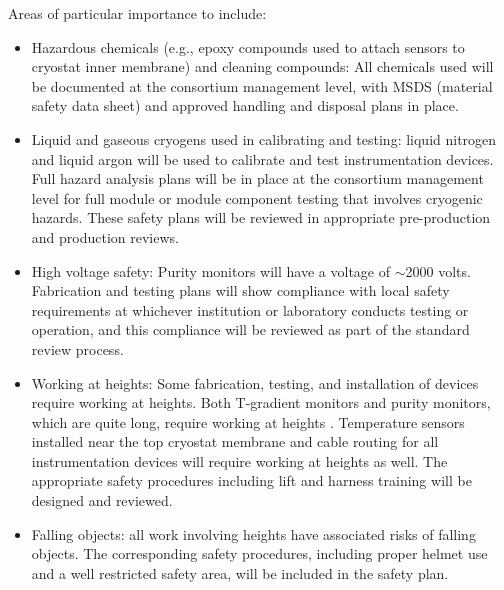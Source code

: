 Areas of particular importance to  include:
\begin{itemize}
\item Hazardous chemicals (e.g., epoxy compounds used to attach sensors to cryostat inner membrane) and cleaning compounds:
  All chemicals used will be documented at the consortium management level, with MSDS (material safety data sheet) and approved handling and disposal plans in place.

\item Liquid and gaseous cryogens used in calibrating and testing: liquid nitrogen and liquid argon will be used to calibrate and test instrumentation devices.
  Full hazard analysis plans will be in place at the consortium management level for full module or
  module component testing that involves cryogenic hazards. These safety plans will be reviewed in appropriate pre-production and production reviews.

\item High voltage safety:  Purity monitors will have a voltage of $\sim$2000 volts. Fabrication and testing plans will show compliance with local
   safety requirements at whichever institution or laboratory conducts testing or operation, and this compliance will be reviewed as part of the standard review process.


\item Working at heights: Some fabrication, testing, and installation of  devices require working at heights. Both T-gradient monitors and purity monitors, which are quite long, require working at heights  . Temperature sensors installed near the top cryostat membrane and cable routing for all instrumentation devices
  will require working at heights as well. The appropriate safety procedures including lift and harness training will be designed and reviewed. 
  
\item Falling objects: all work involving heights have associated risks of falling objects. The corresponding safety procedures, including proper helmet use 
and a well restricted safety area, will be included in the safety plan. 
\end{itemize}


